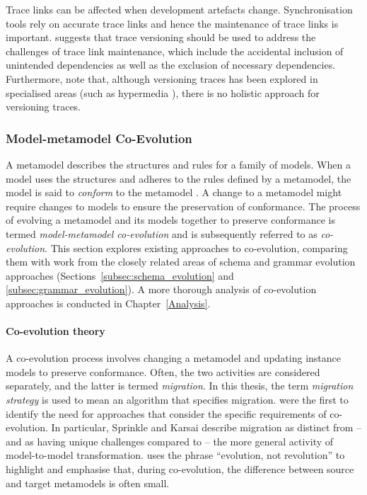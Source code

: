 Trace links can be affected when development artefacts change. Synchronisation tools rely on accurate trace links and hence the maintenance of trace links is important. \cite{winkler09survey} suggests that trace versioning should be used to address the challenges of trace link maintenance, which include the accidental inclusion of unintended dependencies as well as the exclusion of necessary dependencies. Furthermore, \cite{winkler09survey} note that, although versioning traces has been explored in specialised areas (such as hypermedia \cite{nguyen05versioning}), there is no holistic approach for versioning traces.

\subsubsection{Model-metamodel Co-Evolution}
\label{LitReview:ModelCoEvo}
A metamodel describes the structures and rules for a family of models. When a model uses the structures and adheres to the rules defined by a metamodel, the model is said to \emph{conform} to the metamodel \cite{bezivin05unification}. A change to a metamodel might require changes to models to ensure the preservation of conformance. The process of evolving a metamodel and its models together to preserve conformance is termed \emph{model-metamodel co-evolution} and is subsequently referred to as \emph{co-evolution}. This section explores existing approaches to co-evolution, comparing them with work from the closely related areas of schema and grammar evolution approaches (Sections~\ref{subsec:schema_evolution} and \ref{subsec:grammar_evolution}). A more thorough analysis of co-evolution approaches is conducted in Chapter~\ref{Analysis}.

\paragraph{Co-evolution theory}
A co-evolution process involves changing a metamodel and updating instance models to preserve conformance. Often, the two activities are considered separately, and the latter is termed \emph{migration}. In this thesis, the term \emph{migration strategy} is used to mean an algorithm that specifies migration. \cite{sprinkle04domain} were the first to identify the need for approaches that consider the specific requirements of co-evolution. In particular, Sprinkle and Karsai describe migration as distinct from -- and as having unique challenges compared to -- the more general activity of model-to-model transformation. \cite{sprinkle03thesis} uses the phrase ``evolution, not revolution'' to highlight and emphasise that, during co-evolution, the difference between source and target metamodels is often small.

